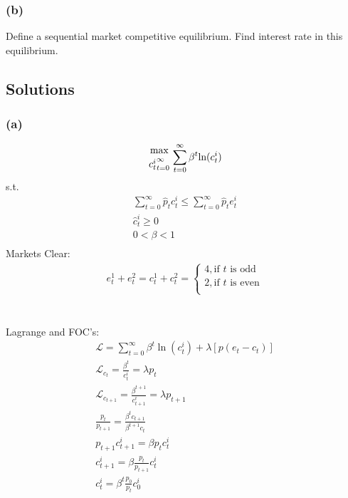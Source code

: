 \documentclass[10pt, a4paper]{article}
\begin{document}
    \subsubsection*{(b)}
      Define a sequential market competitive equilibrium. Find interest rate in this equilibrium.

  \subsection*{Solutions}
    \subsubsection*{(a)}
      \begin{gather*}
        {\max\atop{c_t^i}_{t=0}^{\infty}}\sum\limits_{t=0}^{\infty}\beta^t\text{ln}(c_t^i)
      \end{gather*}
      s.t.
      \begin{gather*}
        \sum\limits_{t=0}^{\infty}\hat{p}_tc_t^i\leq\sum\limits_{t=0}^{\infty}\hat{p}_te_t^i \\
        \hat{c}_t^i\geq0 \\
        0<\beta<1 \\
      \end{gather*}
      Markets Clear:
      \begin{gather*}
        e_t^1+e_t^2 = c_t^1+c_t^2 = \begin{cases}
          4, \text{if $t$ is odd} \\
          2, \text{if $t$ is even} \\
        \end{cases}
      \end{gather*} \\
      \\
      Lagrange and FOC's: 
      \begin{gather*}
        \mathcal{L} = \sum\limits_{t=0}^{\infty}\beta^t\ln(c_t^i) + \lambda[p(e_t-c_t)] \\
        \mathcal{L}_{c_t} = \frac{\beta^t}{c_t^i} = \lambda p_t \\
        \mathcal{L}_{c_{t+1}} = \frac{\beta^{t+1}}{c_{t+1}^i} = \lambda p_{t+1} \\
        \frac{p_t}{p_{t+1}} = \frac{\beta^tc_{t+1}}{\beta^{t+1}c_t} \\
        p_{t+1}c_{t+1}^i = \beta p_tc_t^i \\
        c_{t+1}^i = \beta\frac{p_t}{p_{t+1}}c_t^i \\
        c_t^i = \beta^t\frac{p_0}{p_t}c_0^i
      \end{gather*} \\
\end{document}
